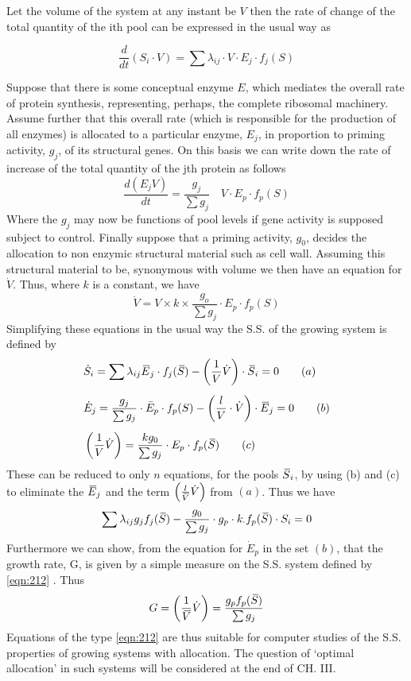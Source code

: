 Let the volume of the system at any instant be $V$ then the rate of change of the total quantity of the ith pool can be expressed in the usual way as

$$\frac{d}{d t}\left(S_{i} \cdot V\right)=\sum \lambda_{ij} \cdot V \cdot E_{j} \cdot f_{j}(S)$$

Suppose that there is some conceptual enzyme $E$, which mediates the overall rate of protein synthesis, representing, perhaps, the complete ribosomal machinery. Assume further that this overall rate (which is responsible for the production of all enzymes) is allocated to a particular enzyme, $E_{j}$, in proportion to priming activity, $g_j$, of its structural genes. On this basis we can write down the rate of increase of the total quantity of the jth protein as follows
%
$$
\frac{d\left(E_{j} V \right)}{dt} =\frac{g_{j}}{\sum g_{j}} \quad V \cdot E_{p} \cdot f_{p}(S)
$$
%
Where the $g_{j}$ may now be functions of pool levels if gene activity is supposed subject to control. Finally suppose that a priming activity, $g_{0}$, decides the allocation to non enzymic structural material such as cell wall. Assuming this structural material to be, synonymous with volume we then have an equation for $\dot{V}$. Thus, where $k$ is a constant, we have
%
$$
\dot{V}=V \times k \times \frac{g_{o}}{\sum g_{j}} \cdot E_{p} \cdot f_{p}(S)
$$
%
Simplifying these equations in the usual way the S.S. of the growing system is defined by
%
\begin{equation}
\begin{aligned}
& \dot{S}_{i}=\sum \lambda_{ij} \,\overline{\!{E}}_{j} \cdot f_{j}(\,\overline{\!{S}})-\left(\frac{1}{V} \dot{V}\right) \cdot \,\overline{\!{S}}_{i}=0  \qquad (a) \\[5pt]
& \dot{E}_{j}=\frac{g_{j}}{\sum g_{j}} \cdot \bar{E}_{p} \cdot f_{p}(S)-\left(\frac{l}{V} \cdot \dot{V}\right) \cdot \,\overline{\!{E}}_{j}=0 \qquad (b) \\[5pt]
& \left(\frac{1}{V} \dot{V}\right)=\frac{k g_{0}}{\sum g_{j}} \cdot E_{p} \cdot f_{p}(\,\overline{\!{S}}) \qquad (c)
\end{aligned}
\label{eqn:211}
\end{equation}
%
These can be reduced to only $n$ equations, for the pools $\,\overline{\!{S}}_{i}$, by using (b) and (c) to eliminate the $\,\overline{\!{E}}_{j}$ and the term $\left(\frac{l}{\,\overline{\!{V}}} \dot{V}\right)$ from $(a)$. Thus we have
%
\begin{equation}
\sum \lambda_{ij} g_{j} f_{j}(\,\overline{\!{S}})-\frac{g_{0}}{\sum g_{j}} \cdot g_{p} \cdot k_{\cdot} f_{p}(\,\overline{\!{S}}) \cdot S_{i}=0
\label{eqn:212}
\end{equation}
%
Furthermore we can show, from the equation for $\dot{E}_{p}$ in the set $(b)$, that the growth rate, G, is given by a simple measure on the S.S. system defined by \eqref{eqn:212} . Thus
%
\begin{equation}
G=\left(\frac{1}{\,\overline{\!{V}}} \dot{V}\right)=\frac{g_{p} f_{p}(\,\overline{\!{S}})}{\sum g_{j}}
\label{eqn:213}
\end{equation}
%
Equations of the type \eqref{eqn:212} are thus suitable for computer studies of the S.S. properties of growing systems with allocation. The question of `optimal allocation' in such systems will be considered at the end of CH. III. 